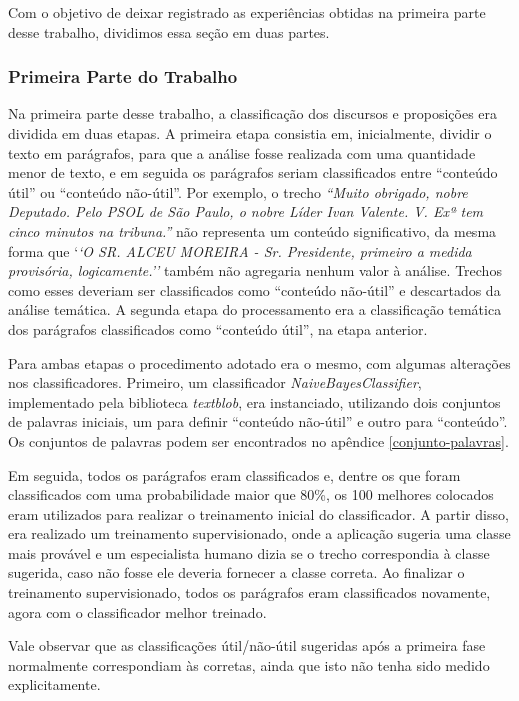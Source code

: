 Com o objetivo de deixar registrado as experiências obtidas na primeira parte desse trabalho, dividimos essa seção em duas partes.

\subsubsection{Primeira Parte do Trabalho}

Na primeira parte desse trabalho, a classificação dos discursos e proposições era dividida em duas etapas. A primeira etapa consistia em, inicialmente, dividir o texto em parágrafos, para que a análise fosse realizada com uma quantidade menor de texto, e em seguida os parágrafos seriam classificados entre ``conteúdo útil'' ou ``conteúdo não-útil''. Por exemplo, o trecho \textit{``Muito obrigado, nobre Deputado. Pelo PSOL de São Paulo, o nobre Líder Ivan Valente. V. Exª tem cinco minutos na tribuna.''} não representa um conteúdo significativo, da mesma forma que `\textit{`O SR. ALCEU MOREIRA - Sr. Presidente, primeiro a medida provisória, logicamente.''} também não agregaria nenhum valor à análise. Trechos como esses deveriam ser classificados como ``conteúdo não-útil'' e descartados da análise temática. A segunda etapa do processamento era a classificação temática dos parágrafos classificados como ``conteúdo útil'', na etapa anterior.

Para ambas etapas o procedimento adotado era o mesmo, com algumas alterações nos classificadores. Primeiro, um classificador \textit{NaiveBayesClassifier}, implementado pela biblioteca \textit{textblob}, era instanciado, utilizando dois conjuntos de palavras iniciais, um para definir ``conteúdo não-útil'' e outro para ``conteúdo''. Os conjuntos de palavras podem ser encontrados no apêndice \ref{conjunto-palavras}.

Em seguida, todos os parágrafos eram classificados e, dentre os que foram classificados com uma probabilidade maior que 80\%, os 100 melhores colocados eram utilizados para realizar o treinamento inicial do classificador. A partir disso, era realizado um treinamento supervisionado, onde a aplicação sugeria uma classe mais provável e um especialista humano dizia se o trecho correspondia à classe sugerida, caso não fosse ele deveria fornecer a classe correta. Ao finalizar o treinamento supervisionado, todos os parágrafos eram classificados novamente, agora com o classificador melhor treinado.

Vale observar que as classificações útil/não-útil sugeridas após a primeira fase normalmente correspondiam às corretas, ainda que isto não tenha sido medido explicitamente.

